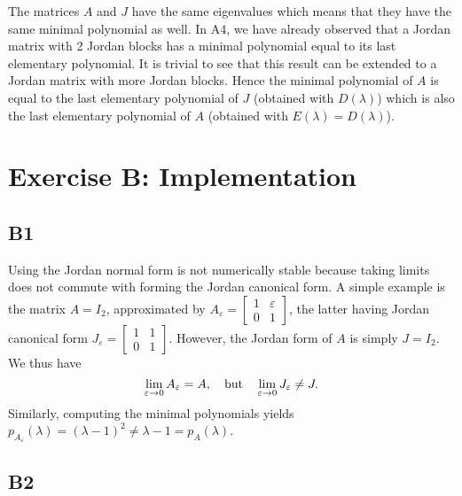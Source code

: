 \documentclass[11pt]{article}
\begin{document}
The matrices $A$ and $J$ have the same eigenvalues which means that they have the same minimal polynomial as well. In A4, we have already observed that a Jordan matrix with 2 Jordan blocks has a minimal polynomial equal to its last elementary polynomial. It is trivial to see that this result can be extended to a Jordan matrix with more Jordan blocks. Hence the minimal polynomial of $A$ is equal to the last elementary polynomial of $J$ (obtained with $D(\lambda)$) which is also the last elementary polynomial of $A$ (obtained with $E(\lambda) = D(\lambda)$). 
\section*{Exercise B: Implementation}
\subsection*{B1}
Using the Jordan normal form is not numerically stable because taking limits does not commute with forming the Jordan canonical form.
A simple example is the matrix \(A = I_2\), approximated by \(A_\varepsilon = \left[\begin{smallmatrix} 1 & \varepsilon \\ 0 & 1\end{smallmatrix}\right]\), the latter having Jordan canonical form \(J_\varepsilon = \left[\begin{smallmatrix} 1 & 1 \\ 0 & 1\end{smallmatrix}\right]\).
However, the Jordan form of \(A\) is simply \(J = I_2\).
We thus have
\[
\lim_{\varepsilon \to 0} A_\varepsilon = A, \quad \textnormal{but} \quad \lim_{\varepsilon \to 0} J_\varepsilon \neq J.
\]
Similarly, computing the minimal polynomials yields \(p_{A_\varepsilon}(\lambda) = (\lambda - 1)^2 \ne \lambda - 1 = p_A(\lambda)\).

\subsection*{B2}
\end{document}
